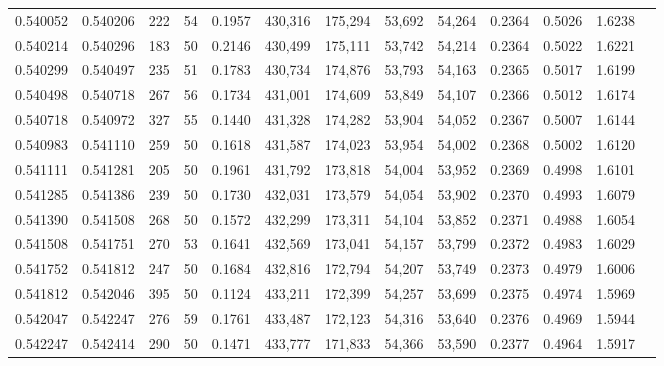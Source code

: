 \begin{tabular}{rrrrrrrrrrrrr}
0.540052 & 0.540206 &   222 &  54 &                                     0.1957 & 430,316 & 175,294 &  53,692 &  54,264 & 0.2364 & 0.5026 & 1.6238 \\
0.540214 & 0.540296 &   183 &  50 &                                     0.2146 & 430,499 & 175,111 &  53,742 &  54,214 & 0.2364 & 0.5022 & 1.6221 \\
0.540299 & 0.540497 &   235 &  51 &                                     0.1783 & 430,734 & 174,876 &  53,793 &  54,163 & 0.2365 & 0.5017 & 1.6199 \\
0.540498 & 0.540718 &   267 &  56 &                                     0.1734 & 431,001 & 174,609 &  53,849 &  54,107 & 0.2366 & 0.5012 & 1.6174 \\
0.540718 & 0.540972 &   327 &  55 &                                     0.1440 & 431,328 & 174,282 &  53,904 &  54,052 & 0.2367 & 0.5007 & 1.6144 \\
0.540983 & 0.541110 &   259 &  50 &                                     0.1618 & 431,587 & 174,023 &  53,954 &  54,002 & 0.2368 & 0.5002 & 1.6120 \\
0.541111 & 0.541281 &   205 &  50 &                                     0.1961 & 431,792 & 173,818 &  54,004 &  53,952 & 0.2369 & 0.4998 & 1.6101 \\
0.541285 & 0.541386 &   239 &  50 &                                     0.1730 & 432,031 & 173,579 &  54,054 &  53,902 & 0.2370 & 0.4993 & 1.6079 \\
0.541390 & 0.541508 &   268 &  50 &                                     0.1572 & 432,299 & 173,311 &  54,104 &  53,852 & 0.2371 & 0.4988 & 1.6054 \\
0.541508 & 0.541751 &   270 &  53 &                                     0.1641 & 432,569 & 173,041 &  54,157 &  53,799 & 0.2372 & 0.4983 & 1.6029 \\
0.541752 & 0.541812 &   247 &  50 &                                     0.1684 & 432,816 & 172,794 &  54,207 &  53,749 & 0.2373 & 0.4979 & 1.6006 \\
0.541812 & 0.542046 &   395 &  50 &                                     0.1124 & 433,211 & 172,399 &  54,257 &  53,699 & 0.2375 & 0.4974 & 1.5969 \\
0.542047 & 0.542247 &   276 &  59 &                                     0.1761 & 433,487 & 172,123 &  54,316 &  53,640 & 0.2376 & 0.4969 & 1.5944 \\
0.542247 & 0.542414 &   290 &  50 &                                     0.1471 & 433,777 & 171,833 &  54,366 &  53,590 & 0.2377 & 0.4964 & 1.5917 \\

\end{tabular}

